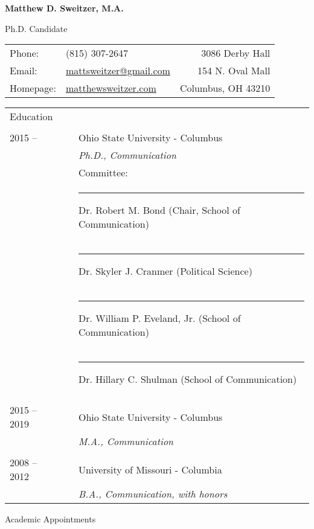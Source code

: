 \documentclass[letterpaper, 12pt]{article}
\def\name{Matthew D. Sweitzer, M.A.}
\begin{document}
{%
\begin{center}
{\Large \textbf{\name}}

Ph.D. Candidate
\end{center}

\vspace{12pt}

\begin{tabularx}{\textwidth}{lXr}
Phone: & (815) 307-2647 & 3086 Derby Hall\\
Email: & \href{mailto:mattsweitzer@gmail.com}{mattsweitzer@gmail.com} & 154 N. Oval Mall\\
Homepage: & \href{https://www.matthewsweitzer.com}{matthewsweitzer.com} & Columbus, OH 43210\\
\end{tabularx}

\vspace{18pt}
\raggedright

\begin{tabular}{lll}
\large{Education} && \\
\normalsize \\
2015 -- && Ohio State University - Columbus\\
&& \textit{Ph.D., Communication}\\
&& Committee: \\
&& \rule{0.25in}{0pt}Dr. Robert M. Bond (Chair, School of Communication)\\
&& \rule{0.25in}{0pt}Dr. Skyler J. Cranmer (Political Science)\\
&& \rule{0.25in}{0pt}Dr. William P. Eveland, Jr. (School of Communication)\\
&& \rule{0.25in}{0pt}Dr. Hillary C. Shulman (School of Communication)\\
\\
2015 -- 2019 && Ohio State University - Columbus\\
&& \textit{M.A., Communication}\\
\\
2008 -- 2012 && University of Missouri - Columbia\\
&& \textit{B.A., Communication, with honors}\\
\end{tabular}

\vspace{12pt}
{\large Academic Appointments}

}
\end{document}
